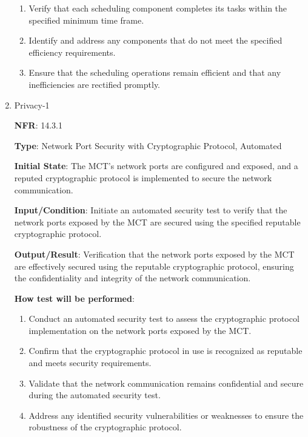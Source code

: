 \documentclass[12pt, titlepage]{article}
\begin{document}
\begin{enumerate}
\begin{enumerate}
    \item Verify that each scheduling component completes its tasks within the specified minimum time frame.

    \item Identify and address any components that do not meet the specified efficiency requirements.

    \item Ensure that the scheduling operations remain efficient and that any inefficiencies are rectified promptly.


\end{enumerate}




\item {Privacy-1\\}

\textbf{NFR}: 14.3.1

\textbf{Type}: Network Port Security with Cryptographic Protocol, Automated


\textbf{Initial State}: The MCT's network ports are configured and exposed, and a reputed cryptographic protocol is implemented to secure the network communication.




\textbf{Input/Condition}: Initiate an automated security test to verify that the network ports exposed by the MCT are secured using the specified reputable cryptographic protocol.

\textbf{Output/Result}: Verification that the network ports exposed by the MCT are effectively secured using the reputable cryptographic protocol, ensuring the confidentiality and integrity of the network communication.

\textbf{How test will be performed}: 
\begin{enumerate}
    \item Conduct an automated security test to assess the cryptographic protocol implementation on the network ports exposed by the MCT.


    \item Confirm that the cryptographic protocol in use is recognized as reputable and meets security requirements.


    \item Validate that the network communication remains confidential and secure during the automated security test.


    \item Address any identified security vulnerabilities or weaknesses to ensure the robustness of the cryptographic protocol.



\end{enumerate}
















 
\end{enumerate}
\end{document}
